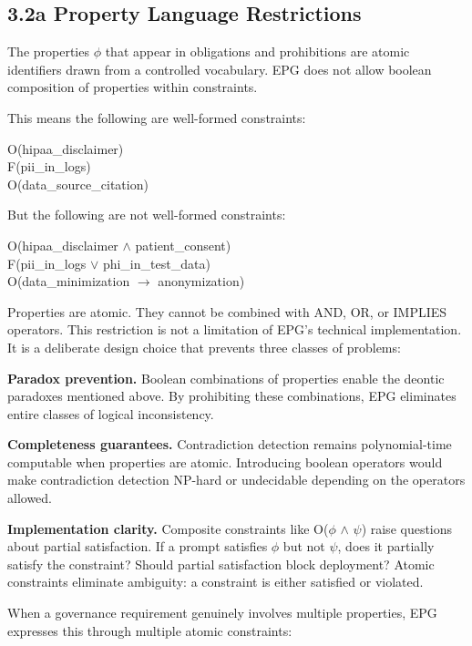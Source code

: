 \subsection{3.2a Property Language Restrictions}


The properties $\phi$ that appear in obligations and prohibitions are atomic identifiers drawn from a controlled vocabulary. EPG does not allow boolean composition of properties within constraints.

This means the following are well-formed constraints:

\begin{claddisp}
O(hipaa\_disclaimer)\\
F(pii\_in\_logs)\\
O(data\_source\_citation)
\end{claddisp}


But the following are not well-formed constraints:

\begin{claddisp}
O(hipaa\_disclaimer $\wedge$ patient\_consent)\\
F(pii\_in\_logs $\vee$ phi\_in\_test\_data)\\
O(data\_minimization $\to$ anonymization)
\end{claddisp}


Properties are atomic. They cannot be combined with AND, OR, or IMPLIES operators. This restriction is not a limitation of EPG's technical implementation. It is a deliberate design choice that prevents three classes of problems:

\textbf{Paradox prevention.} Boolean combinations of properties enable the deontic paradoxes mentioned above. By prohibiting these combinations, EPG eliminates entire classes of logical inconsistency.

\textbf{Completeness guarantees.} Contradiction detection remains polynomial-time computable when properties are atomic. Introducing boolean operators would make contradiction detection NP-hard or undecidable depending on the operators allowed.

\textbf{Implementation clarity.} Composite constraints like O($\phi$ $\wedge$ $\psi$) raise questions about partial satisfaction. If a prompt satisfies $\phi$ but not $\psi$, does it partially satisfy the constraint? Should partial satisfaction block deployment? Atomic constraints eliminate ambiguity: a constraint is either satisfied or violated.

When a governance requirement genuinely involves multiple properties, EPG expresses this through multiple atomic constraints:


